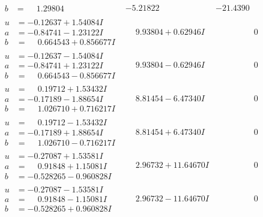 \documentclass[1p]{elsarticle_modified}
\theoremstyle{definition}
\begin{document}
$$\begin{array}{c|c|c}
\begin{aligned}
b &= \phantom{-}1.29804\phantom{ +0.000000I}\end{aligned}
 & -5.21822\phantom{ +0.000000I} & -21.4390\phantom{ +0.000000I} \\ \hline\begin{aligned}
u &= -0.12637 + 1.54084 I \\
a &= -0.84741 - 1.23122 I \\
b &= \phantom{-}0.664543 + 0.856677 I\end{aligned}
 & \phantom{-}9.93804 + 0.62946 I & \phantom{-0.000000 } 0 \\ \hline\begin{aligned}
u &= -0.12637 - 1.54084 I \\
a &= -0.84741 + 1.23122 I \\
b &= \phantom{-}0.664543 - 0.856677 I\end{aligned}
 & \phantom{-}9.93804 - 0.62946 I & \phantom{-0.000000 } 0 \\ \hline\begin{aligned}
u &= \phantom{-}0.19712 + 1.53432 I \\
a &= -0.17189 - 1.88654 I \\
b &= \phantom{-}1.026710 + 0.716217 I\end{aligned}
 & \phantom{-}8.81454 - 6.47340 I & \phantom{-0.000000 } 0 \\ \hline\begin{aligned}
u &= \phantom{-}0.19712 - 1.53432 I \\
a &= -0.17189 + 1.88654 I \\
b &= \phantom{-}1.026710 - 0.716217 I\end{aligned}
 & \phantom{-}8.81454 + 6.47340 I & \phantom{-0.000000 } 0 \\ \hline\begin{aligned}
u &= -0.27087 + 1.53581 I \\
a &= \phantom{-}0.91848 + 1.15081 I \\
b &= -0.528265 - 0.960828 I\end{aligned}
 & \phantom{-}2.96732 + 11.64670 I & \phantom{-0.000000 } 0 \\ \hline\begin{aligned}
u &= -0.27087 - 1.53581 I \\
a &= \phantom{-}0.91848 - 1.15081 I \\
b &= -0.528265 + 0.960828 I\end{aligned}
 & \phantom{-}2.96732 - 11.64670 I & \phantom{-0.000000 } 0 \\ \hline\begin{aligned}

\end{aligned}
\end{array}$$
\end{document}
